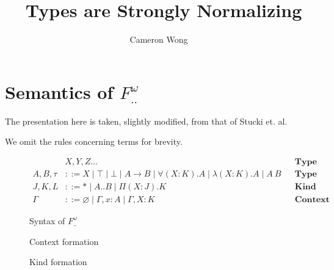 \documentclass[a4paper, 10pt]{article}
\title{\Fwint\ Types are Strongly Normalizing}
\author{Cameron Wong}
\newcommand{\Fwint}{\ensuremath{F^\omega_{..}}}
\newcommand{\interval}[2]{#1 .. #2}
\newcommand{\isctx}[1]{#1\ \texttt{ctx}}
\newcommand{\iskd}[1]{#1\ \texttt{kd}}
\newcommand{\TyKd}{*}
\newcommand{\KDepArr}[3]{\Pi(#1:#2).#3}
\begin{document}
\maketitle

\section{Semantics of \Fwint}

The presentation here is taken, slightly modified, from that of Stucki et. al.

We omit the rules concerning terms for brevity.

\begin{figure}[h]
  \begin{align*}
          & X,Y,Z... && \textbf{Type Variable} \\
    A,B,\tau &::= X \mid \top \mid \bot \mid A \rightarrow B \mid
        \forall(X:K).A \mid \lambda(X:K).A \mid A\ B
      && \textbf{Type} \\
    J,K,L &::= \TyKd \mid \interval{A}{B} \mid \KDepArr{X}{J}{K}
      && \textbf{Kind} \\
    \Gamma &::= \varnothing \mid \Gamma, x:A \mid \Gamma, X:K
      && \textbf{Context}
  \end{align*}
  \caption{Syntax of \Fwint}
\end{figure}

\begin{figure}[ht]
  \caption{Context formation}
\end{figure}

\begin{figure}[ht]
  \caption{Kind formation}
\end{figure}
\end{document}
